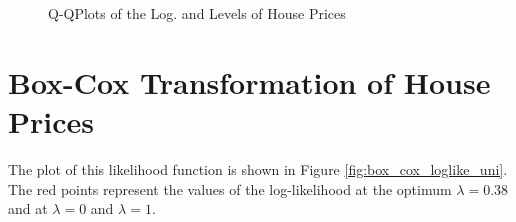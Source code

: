 \begin{figure}[!ht]
\hfill
{}

\caption{Q-QPlots of the Log. and Levels of House Prices}
\label{fig:qq_prices}
\end{figure}





\pagebreak
\section*{Box-Cox Transformation of House Prices}

The plot of this likelihood function is shown in Figure \ref{fig:box_cox_loglike_uni}.
The red points represent the values of the log-likelihood 
at the optimum $\lambda = 0.38$ and at $\lambda = 0$ and $\lambda = 1$.

